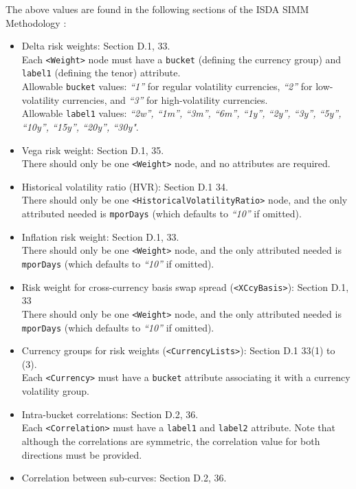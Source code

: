 The above values are found in the following sections of the ISDA SIMM Methodology \cite{SIMM2.6}:
\begin{itemize}
  \item Delta risk weights: Section D.1, 33. \\
    Each {\tt <Weight>} node must have a {\tt bucket} (defining the currency group) and {\tt label1} (defining the tenor) attribute.\\
    Allowable {\tt bucket} values: \emph{``1''} for regular volatility currencies, \emph{``2''} for low-volatility currencies, and \emph{``3''} for high-volatility currencies. \\
    Allowable {\tt label1} values: \emph{``2w'', ``1m'', ``3m'', ``6m'', ``1y'', ``2y'', ``3y'', ``5y'', ``10y'', ``15y'', ``20y'', ``30y"}.
  \item Vega risk weight: Section D.1, 35. \\
    There should only be one {\tt <Weight>} node, and no attributes are required.
  \item Historical volatility ratio (HVR): Section D.1 34. \\
    There should only be one {\tt <HistoricalVolatilityRatio>} node, and the only attributed needed is {\tt mporDays} (which defaults to \emph{``10''} if omitted).
  \item Inflation risk weight: Section D.1, 33. \\
    There should only be one {\tt <Weight>} node, and the only attributed needed is {\tt mporDays} (which defaults to \emph{``10''} if omitted).
  \item Risk weight for cross-currency basis swap spread ({\tt <XCcyBasis>}): Section D.1, 33 \\
    There should only be one {\tt <Weight>} node, and the only attributed needed is {\tt mporDays} (which defaults to \emph{``10''} if omitted).
  \item Currency groups for risk weights ({\tt <CurrencyLists>}): Section D.1 33(1) to (3). \\
    Each {\tt <Currency>} must have a {\tt bucket} attribute associating it with a currency volatility group.
  \item Intra-bucket correlations: Section D.2, 36. \\
    Each {\tt <Correlation>} must have a {\tt label1} and {\tt label2} attribute. Note that although the correlations
    are symmetric, the correlation value for both directions must be provided.
  \item Correlation between sub-curves: Section D.2, 36.

\end{itemize}
